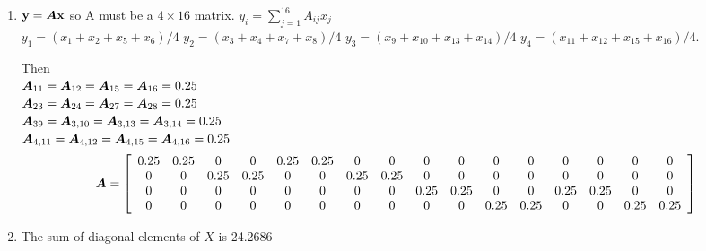 \documentclass{article}
\begin{document}
\begin{enumerate} 
\item $\boldsymbol{\mathrm{y}} = \boldsymbol{A}\boldsymbol{\mathrm{x}} $
so A must be a $4\times 16$ matrix.  $ y_i= \sum_{j=1}^{16}A_{ij}x_j  $ \\
$ y_1 = (x_1 + x_2 + x_5 + x_6)/4 $ \newline
$ y_2 = (x_3 + x_4 + x_7 + x_8)/4   $ \newline
$ y_3 = (x_9 + x_{10} + x_{13} + x_{14})/4 $ \newline
$ y_4 = (x_{11} + x_{12} + x_{15} + x_{16})/4.$ \newline

Then\\ $ \boldsymbol{A}_{11}= \boldsymbol{A}_{12}= \boldsymbol{A}_{15}= \boldsymbol{A}_{16} = 0.25 $\\
$ \boldsymbol{A}_{23}= \boldsymbol{A}_{24}= \boldsymbol{A}_{27}= \boldsymbol{A}_{28} = 0.25 $\\
$ \boldsymbol{A}_{39}= \boldsymbol{A}_{3,10}= \boldsymbol{A}_{3,13}= \boldsymbol{A}_{3,14} = 0.25 $\\
$ \boldsymbol{A}_{4,11}= \boldsymbol{A}_{4,12}= \boldsymbol{A}_{4,15}= \boldsymbol{A}_{4,16} = 0.25 $\\

\begin{equation*}\boldsymbol{A}=
\left[
\begin{array}{cccccccccccccccc}
0.25 & 0.25 & 0 & 0 & 0.25 & 0.25 & 0 & 0 & 0 & 0 & 0 & 0 & 0 & 0 & 0 & 0  \\
0 & 0 & 0.25 & 0.25 & 0 & 0 & 0.25 & 0.25 & 0 & 0 & 0 & 0 & 0 & 0 & 0 & 0  \\
0 & 0 & 0 & 0 & 0 & 0 & 0 & 0 & 0.25 & 0.25 & 0 & 0 & 0.25 & 0.25 & 0 & 0 \\
0 & 0 & 0 & 0 & 0 & 0 & 0 & 0 & 0 & 0 & 0.25 & 0.25 & 0 & 0 & 0.25 & 0.25 \\
\end{array}
\right]
\end{equation*}
\item The sum of diagonal elements of $X$ is 24.2686  \\


\end{enumerate}
\end{document}
